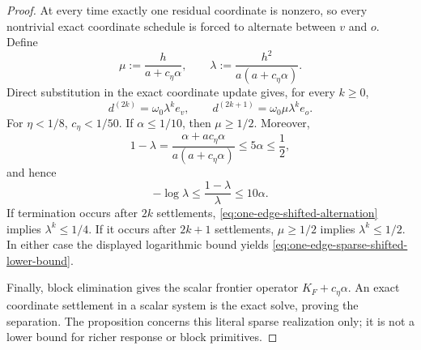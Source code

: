 \begin{proof}
At every time exactly one residual coordinate is nonzero, so every
nontrivial exact coordinate schedule is forced to alternate between $v$ and
$o$.  Define
\begin{equation*}
 \mu:=\frac{h}{a+c_\eta\alpha},
 \qquad
 \lambda:=\frac{h^2}{a(a+c_\eta\alpha)}.
\end{equation*}
Direct substitution in the exact coordinate update gives, for every $k\geq0$,
\begin{equation}
 d^{(2k)}=\omega_0\lambda^ke_v,
 \qquad
 d^{(2k+1)}=\omega_0\mu\lambda^ke_o.
 \label{eq:one-edge-shifted-alternation}
\end{equation}
For $\eta<1/8$, $c_\eta<1/50$.  If $\alpha\leq1/10$, then
$\mu\geq1/2$.  Moreover,
\begin{equation*}
 1-\lambda
 =\frac{\alpha+a c_\eta\alpha}{a(a+c_\eta\alpha)}
 \leq5\alpha\leq\frac12,
\end{equation*}
and hence
\begin{equation*}
 -\log\lambda
 \leq\frac{1-\lambda}{\lambda}
 \leq10\alpha.
\end{equation*}
If termination occurs after $2k$ settlements,
\cref{eq:one-edge-shifted-alternation} implies $\lambda^k\leq1/4$.
If it occurs after $2k+1$ settlements, $\mu\geq1/2$ implies
$\lambda^k\leq1/2$.  In either case the displayed logarithmic bound yields
\cref{eq:one-edge-sparse-shifted-lower-bound}.

Finally, block elimination gives the scalar frontier operator
$K_F+c_\eta\alpha$.  An exact coordinate settlement in a scalar system is
the exact solve, proving the separation.  The proposition concerns this
literal sparse realization only; it is not a lower bound for richer response
or block primitives.
\end{proof}

